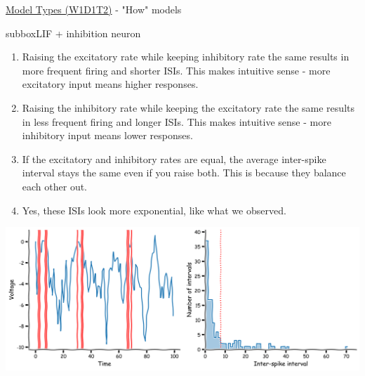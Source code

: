 \begin{textbox}{\href{https://compneuro.neuromatch.io/tutorials/W1D1_ModelTypes/student/W1D1_Tutorial2.html}{Model Types (W1D1T2)} -  "How" models}

\begin{subbox}{subbox}{LIF + inhibition neuron}
\scriptsize

\begin{enumerate}
    \item 
Raising the excitatory rate while keeping inhibitory rate the same results in
more frequent firing and shorter ISIs. This makes intuitive sense - more excitatory input
means higher responses.
\item Raising the inhibitory rate while keeping the excitatory rate the same results
in less frequent firing and longer ISIs. This makes intuitive sense - more inhibitory input
means lower responses.
\item If the excitatory and inhibitory rates are equal, the average inter-spike interval
stays the same even if you raise both. This is because they balance each other out.
\item Yes, these ISIs look more exponential, like what we observed.
\end{enumerate}

\begin{center}
    
\includegraphics[scale=0.1]{Figures/MT/MT_Figure6.png}
\end{center}


\end{subbox}
\end{textbox}
